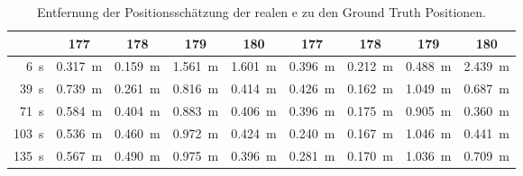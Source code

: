 \begin{table}
	\centering
	\begin{tabular}{||r||c|c|c|c||c|c|c|c||}
		\hline
 & 177 & 178 & 179 & 180 & 177 & 178 & 179 & 180 \\
\hline
\SI{6}{\second} & \SI{0.317}{\meter} & \SI{0.159}{\meter} & \SI{1.561}{\meter} & \SI{1.601}{\meter} & \SI{0.396}{\meter} & \SI{0.212}{\meter} & \SI{0.488}{\meter} & \SI{2.439}{\meter} \\
\SI{39}{\second} & \SI{0.739}{\meter} & \SI{0.261}{\meter} & \SI{0.816}{\meter} & \SI{0.414}{\meter} & \SI{0.426}{\meter} & \SI{0.162}{\meter} & \SI{1.049}{\meter} & \SI{0.687}{\meter} \\
\SI{71}{\second} & \SI{0.584}{\meter} & \SI{0.404}{\meter} & \SI{0.883}{\meter} & \SI{0.406}{\meter} & \SI{0.396}{\meter} & \SI{0.175}{\meter} & \SI{0.905}{\meter} & \SI{0.360}{\meter} \\
\SI{103}{\second} & \SI{0.536}{\meter} & \SI{0.460}{\meter} & \SI{0.972}{\meter} & \SI{0.424}{\meter} & \SI{0.240}{\meter} & \SI{0.167}{\meter} & \SI{1.046}{\meter} & \SI{0.441}{\meter} \\
\SI{135}{\second} & \SI{0.567}{\meter} & \SI{0.490}{\meter} & \SI{0.975}{\meter} & \SI{0.396}{\meter} & \SI{0.281}{\meter} & \SI{0.170}{\meter} & \SI{1.036}{\meter} & \SI{0.709}{\meter} \\
\hline
	\end{tabular}
	\caption{Entfernung der Positionsschätzung der realen e zu den Ground Truth Positionen.}
	\label{tab:distance_between_real_uwb_and_gt}
\end{table}


